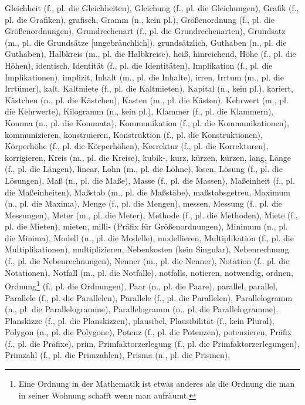 Gleichheit (f., pl. die Gleichheiten),
Gleichung (f., pl. die Gleichungen),
Grafik (f., pl. die Grafiken),
grafisch,
Gramm (n., kein pl.),
Größenordnung (f., pl. die Größenordnungen),
Grundrechenart (f., pl. die Grundrechenarten),
Grundsatz (m., pl. die Grundsätze [ungebräuchlich]),
grundsätzlich,
Guthaben (n., pl. die Guthaben),
Halbkreis (m., pl. die Halbkreise),
heiß,
hinreichend,
Höhe (f., pl. die Höhen),
identisch,
Identität (f., pl. die Identitäten),
Implikation (f., pl. die Implikationen),
implizit,
Inhalt (m., pl. die Inhalte),
irren,
Irrtum (m., pl. die Irrtümer),
kalt,
Kaltmiete (f., pl. die Kaltmieten),
Kapital (n., kein pl.),
kariert,
Kästchen (n., pl. die Kästchen),
Kasten (m., pl. die Kästen),
Kehrwert (m., pl. die Kehrwerte),
Kilogramm (n., kein pl.),
Klammer (f., pl. die Klammern),
Komma (n., pl. die Kommata),
Kommunikation (f., pl. die Kommunikationen),
kommunizieren,
konstruieren,
Konstruktion (f., pl. die Konstruktionen),
Körperhöhe (f., pl. die Körperhöhen),
Korrektur (f., pl. die Korrekturen),
korrigieren,
Kreis (m., pl. die Kreise),
kubik-,
kurz,
kürzen,
kürzen,
lang,
Länge (f., pl. die Längen),
linear,
Lohn (m., pl. die Löhne),
lösen,
Lösung (f., pl. die Lösungen),
Maß (n., pl. die Maße),
Masse (f., pl. die Massen),
Maßeinheit (f., pl. die Maßeinheiten),
Maßstab (m., pl. die Maßstäbe),
maßstabsgetreu,
Maximum (n., pl. die Maxima),
Menge (f., pl. die Mengen),
messen,
Messung (f., pl. die Messungen),
Meter (m., pl. die Meter),
Methode (f., pl. die Methoden),
Miete (f., pl. die Mieten),
mieten,
milli- (Präfix für Größenordnungen),
Minimum (n., pl. die Minima),
Modell (n., pl. die Modelle),
modellieren,
Multiplikation (f., pl. die Multiplikationen),
multiplizieren,
Nebenkosten (kein Singular),
Nebenrechnung (f., pl. die Nebenrechnungen),
Nenner (m., pl. die Nenner),
Notation (f., pl. die Notationen),
Notfall (m., pl. die Notfälle),
notfalls,
notieren,
notwendig,
ordnen,
Ordnung\footnote{Eine Ordnung in der Mathematik ist etwas anderes als die Ordnung die man in seiner Wohnung schafft wenn man aufräumt.} (f., pl. die Ordnungen),
Paar (n., pl. die Paare),
parallel,
parallel,
Parallele (f., pl. die Parallelen),
Parallele (f., pl. die Parallelen),
Parallelogramm (n., pl. die Parallelogramme),
Parallelogramm (n., pl. die Parallelogramme),
Planskizze (f., pl. die Planskizzen),
plausibel,
Plausibilität (f., kein Plural),
Polygon (n., pl. die Polygone),
Potenz (f., pl. die Potenzen),
potenzieren,
Präfix (f., pl. die Präfixe),
prim,
Primfaktorzerlegung (f., pl. die Primfaktorzerlegungen),
Primzahl (f., pl. die Primzahlen),
Prisma (n., pl. die Prismen),
